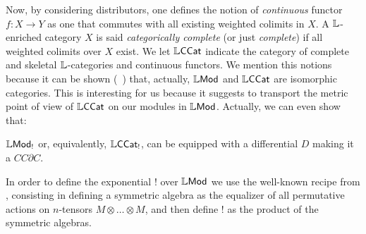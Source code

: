 \documentclass[submission,%
]{eptcs}
\begin{document}
Now, by considering distributors, one defines the notion of \emph{continuous} functor $f:X\to Y$ as one that commutes with all existing weighted colimits in $X$.
A $\mathbb{L}$-enriched category $X$ is said \emph{categorically complete} (or just \emph{complete}) if all weighted colimits over $X$ exist. 
We let $\mathbb{L}\mathsf{CCat}$ indicate the category of complete and skeletal $\mathbb{L}$-categories and continuous functors.
We mention this notions because it can be shown (~\cite{Stubbe2006}) that, actually, $\mathbb{L}\mathsf{Mod}$ and $\mathbb{L}\mathsf{CCat}$ are isomorphic categories.
This is interesting for us because it suggests to transport the metric point of view of $\mathbb{L}\mathsf{CCat}$ on our modules in $\mathbb{L}\mathsf{Mod}$.
Actually, we can even show that:
\begin{theorem}
$\mathbb{L}\mathsf{Mod}_{!}$ or, equivalently, $\mathbb{L}\mathsf{CCat}_{!}$, can be equipped with a differential $D$ making it a $CC\partial C$.
\end{theorem}
In order to define the exponential $!$ over $\mathbb{L}\mathsf{Mod}$ we use the well-known recipe from \cite{Mellies2018, Manzo2013}, consisting in defining a symmetric algebra %
as the equalizer of all permutative actions on $n$-tensors $M\otimes \dots \otimes M$, and then define $!$ as the product of the symmetric algebras.



\end{document}
